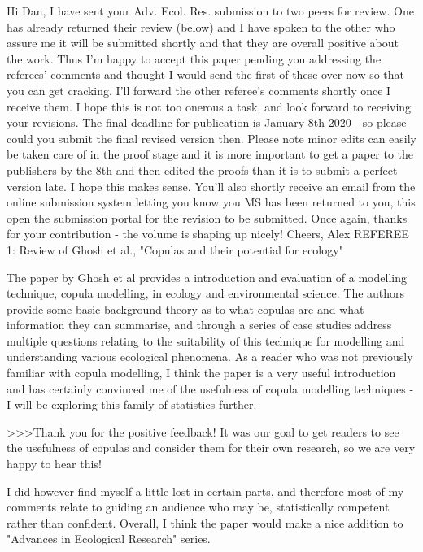Hi Dan,
I have sent your Adv. Ecol. Res. submission to two peers for review. One has already returned their review (below) and I have spoken to the other who assure me it will be submitted shortly and that they are overall positive about the work. Thus I'm happy to accept this paper pending you addressing the referees' comments and thought I would send the first of these over now so that you can get cracking. I'll forward the other referee's comments shortly once I receive them. I hope this is not too onerous a task, and look forward to receiving your revisions. The final deadline for publication is January 8th 2020 - so please could you submit the final revised version then. Please note minor edits can easily be taken care of in the proof stage and it is more important to get a paper to the publishers by the 8th and then edited the proofs than it is to submit a perfect version late. I hope this makes sense. You'll also shortly receive an email from the online submission system letting you know you MS has been returned to you, this open the submission portal for the revision to be submitted. Once again, thanks for your contribution - the volume is shaping up nicely!
Cheers,
Alex
REFEREE 1:
Review of Ghosh et al., "Copulas and their potential for ecology"


The paper by Ghosh et al provides a introduction and evaluation of a modelling technique,
copula modelling, in ecology and environmental science. The authors provide some basic
background theory as to what copulas are and what information they can summarise, and through
a series of case studies address multiple questions relating to the suitability of this technique
for modelling and understanding various ecological phenomena. As a reader who was not previously
familiar with copula modelling, I think the paper is a very useful introduction and has certainly
convinced me of the usefulness of copula modelling techniques - I will be exploring this family
of statistics further.

>>>Thank you for the positive feedback! It was our goal to get readers to see the usefulness of
copulas and consider them for their own research, so we are very happy to hear this!

I did however find myself a little lost in certain parts, and therefore most of my comments relate
to guiding an audience who may be, statistically competent rather than confident. Overall, I
think the paper would make a nice addition to "Advances in Ecological Research" series.

